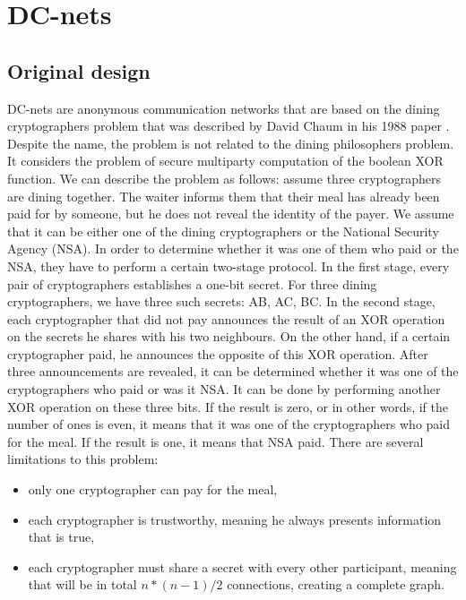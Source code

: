 \section{DC-nets}

\subsection{Original design}
DC-nets are anonymous communication networks that are based on the dining cryptographers problem that was described by David Chaum in his 1988 paper \cite{dc-nets}. Despite the name, the problem is not related to the dining philosophers problem. It considers the problem of secure multiparty computation of the boolean XOR function. 
We can describe the problem as follows: assume three cryptographers are dining together. The waiter informs them that their meal has already been paid for by someone, but he does not reveal the identity of the payer. We assume that it can be either one of the dining cryptographers or the National Security Agency (NSA). In order to determine whether it was one of them who paid or the NSA, they have to perform a certain two-stage protocol.
In the first stage, every pair of cryptographers establishes a one-bit secret. For three dining cryptographers, we have three such secrets: AB, AC, BC. 
In the second stage, each cryptographer that did not pay announces the result of an XOR operation on the secrets he shares with his two neighbours. On the other hand, if a certain cryptographer paid, he announces the opposite of this XOR operation.
After three announcements are revealed, it can be determined whether it was one of the cryptographers who paid or was it NSA. It can be done by performing another XOR operation on these three bits. If the result is zero, or in other words, if the number of ones is even, it means that it was one of the cryptographers who paid for the meal. If the result is one, it means that NSA paid.
There are several limitations to this problem:
\begin{itemize}
    \item only one cryptographer can pay for the meal,
    \item each cryptographer is trustworthy, meaning he always presents information that is true,
    \item each cryptographer must share a secret with every other participant, meaning that will be in total $n * (n-1) / 2$ connections, creating a complete graph.
\end{itemize}
